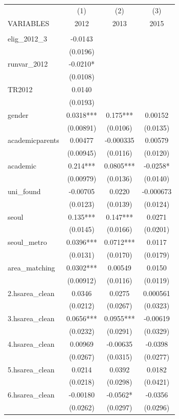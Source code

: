 \documentclass[]{article}
\begin{document}
\begin{tabular}{lccc} \hline
 & (1) & (2) & (3) \\
VARIABLES & 2012 & 2013 & 2015 \\ \hline
 &  &  &  \\
elig\_2012\_3 & -0.0143 &  &  \\
 & (0.0196) &  &  \\
runvar\_2012 & -0.0210* &  &  \\
 & (0.0108) &  &  \\
TR2012 & 0.0140 &  &  \\
 & (0.0193) &  &  \\
gender & 0.0318*** & 0.175*** & 0.00152 \\
 & (0.00891) & (0.0106) & (0.0135) \\
academicparents & 0.00477 & -0.000335 & 0.00579 \\
 & (0.00945) & (0.0116) & (0.0120) \\
academic & 0.214*** & 0.0805*** & -0.0258* \\
 & (0.00979) & (0.0136) & (0.0140) \\
uni\_found & -0.00705 & 0.0220 & -0.000673 \\
 & (0.0123) & (0.0139) & (0.0124) \\
seoul & 0.135*** & 0.147*** & 0.0271 \\
 & (0.0145) & (0.0166) & (0.0201) \\
seoul\_metro & 0.0396*** & 0.0712*** & 0.0117 \\
 & (0.0131) & (0.0170) & (0.0179) \\
area\_matching & 0.0302*** & 0.00549 & 0.0150 \\
 & (0.00912) & (0.0116) & (0.0119) \\
2.hsarea\_clean & 0.0346 & 0.0275 & 0.000561 \\
 & (0.0212) & (0.0267) & (0.0323) \\
3.hsarea\_clean & 0.0656*** & 0.0955*** & -0.00619 \\
 & (0.0232) & (0.0291) & (0.0329) \\
4.hsarea\_clean & 0.00969 & -0.00635 & -0.0398 \\
 & (0.0267) & (0.0315) & (0.0277) \\
5.hsarea\_clean & 0.0214 & 0.0392 & 0.0182 \\
 & (0.0218) & (0.0298) & (0.0421) \\
6.hsarea\_clean & -0.00180 & -0.0562* & -0.0356 \\
 & (0.0262) & (0.0297) & (0.0296) \\

\end{tabular}
\end{document}
